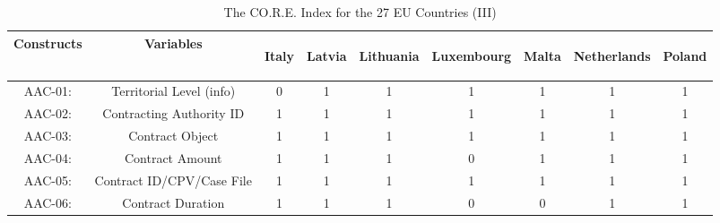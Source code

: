 \documentclass[a4paper, twoside]{report}
\begin{document}
\begin{table}[htbp]
  \centering
  \caption{The CO.R.E. Index for the 27 EU Countries (III)}
   \tabcolsep=0.80cm
	\renewcommand{\arraystretch}{0.95}
	\begin{adjustbox}{max width=\linewidth}
         \begin{tabular}{rcccccccc}
    \multicolumn{1}{c}{Constructs} & Variables & \multicolumn{1}{l}{\begin{sideways}Italy\end{sideways}} & \multicolumn{1}{l}{\begin{sideways}Latvia\end{sideways}} & \multicolumn{1}{l}{\begin{sideways}Lithuania\end{sideways}} & \multicolumn{1}{l}{\begin{sideways}Luxembourg\end{sideways}} & \multicolumn{1}{l}{\begin{sideways}Malta\end{sideways}} & \multicolumn{1}{l}{\begin{sideways}Netherlands\end{sideways}} & \multicolumn{1}{l}{\begin{sideways}Poland\end{sideways}} \\
    \midrule
    \multicolumn{1}{c}{AAC-01:} & \multicolumn{1}{p{19em}}{Territorial Level (info)} & 0     & 1     & 1     & 1     & 1     & 1     & 1 \\
    \multicolumn{1}{c}{AAC-02:} & \multicolumn{1}{p{19em}}{Contracting Authority ID} & 1     & 1     & 1     & 1     & 1     & 1     & 1 \\
    \multicolumn{1}{c}{AAC-03:} & \multicolumn{1}{p{19em}}{Contract Object} & 1     & 1     & 1     & 1     & 1     & 1     & 1 \\
    \multicolumn{1}{c}{AAC-04:} & \multicolumn{1}{p{19em}}{Contract Amount} & 1     & 1     & 1     & 0     & 1     & 1     & 1 \\
    \multicolumn{1}{c}{AAC-05:} & \multicolumn{1}{p{19em}}{Contract ID/CPV/Case File} & 1     & 1     & 1     & 1     & 1     & 1     & 1 \\
    \multicolumn{1}{c}{AAC-06:} & \multicolumn{1}{p{19em}}{Contract Duration} & 1     & 1     & 1     & 0     & 0     & 1     & 1 \\

\end{tabular}
\end{adjustbox}
\end{table}
\end{document}
